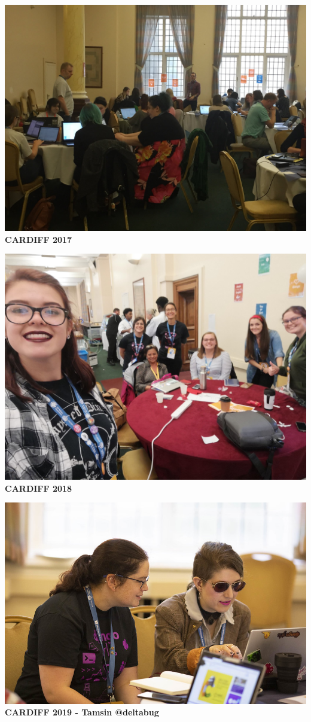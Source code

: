 \documentclass{beamer}
\begin{document}
\begin{frame}
        \centering
    \includegraphics[width=.7\textwidth]{static/cardiff_2017} \\
    \textbf{CARDIFF 2017}
\end{frame}

\begin{frame}
    \centering
    \includegraphics[width=.7\textwidth]{static/cardiff_2018} \\
    \textbf{CARDIFF 2018}
\end{frame}

\begin{frame}
    \begin{center}
    \includegraphics[width=.7\textwidth]{static/coach} \\
    \textbf{CARDIFF 2019 - Tamsin @deltabug}
    \end{center}
\end{frame}
\end{document}
